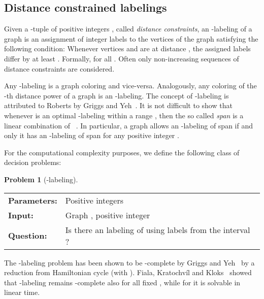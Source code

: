 \documentclass[a4paper,UKenglish]{lipics}
\newcommand{\NP}{{\sf{NP}}\xspace}
\theoremstyle{plain}
\theoremstyle{definition}
\newtheorem{prob}[theorem]{Problem}
\begin{document}
\subsection{Distance constrained labelings}

Given a -tuple of positive integers , called \emph{distance constraints}, an -labeling of a graph is an assignment  of integer labels to the vertices of the graph satisfying the following condition: 
Whenever vertices  and  are at distance , the assigned labels differ by at least . 
Formally,  for all . 
Often only non-increasing sequences of distance constraints are considered.

Any -labeling is a graph coloring and vice-versa. Analogously, any coloring of the -th distance power of a graph is an -labeling. 
The concept of -labeling is attributed to Roberts by Griggs and Yeh~\cite{l:GY92}. 
It is not difficult to show that whenever  is an optimal -labeling within a range , 
then the so called \emph{span}  is a linear combination of ~\cite{l:GY92,l:Kral06}. 
In particular, a graph  allows an -labeling of span  if and only it has an -labeling of span  for any positive integer .

For the computational complexity purposes, we define the following class of decision problems:

\begin{prob}[\sc -labeling]~
\begin{center}
\begin{tabular} {|ll|}
      \hline
      {\bf Parameters:\enspace} & {\parbox[t]{27em}{Positive integers }}\\
      {\bf Input:\enspace} & {\parbox[t]{27em}{Graph , positive integer }}\\
      {\bf Question:\enspace}&\parbox[t]{27em}{Is there an  labeling of  using labels from the interval ?}\\
      \hline
\end{tabular}
\end{center}
\end{prob}

The {\sc -labeling} problem has been shown to be \NP-complete by Griggs and Yeh~\cite{l:GY92} 
by a reduction from {\sc Hamiltonian cycle} (with ). 
Fiala, Kratochvíl and Kloks~\cite{l:FKK01} showed that {\sc -labeling} 
remains \NP-complete also for all fixed ,
while for  it is solvable in linear time. 
\end{document}
